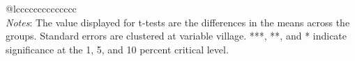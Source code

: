 \begin{tabular}{@{\extracolsep{5pt}}lcccccccccccccc}
\hline \hline \\[-1.8ex]
{\textit{Notes}:  The value displayed for t-tests are the differences in the means across the groups. Standard errors are clustered at variable village. ***, **, and * indicate significance at the 1, 5, and 10 percent critical level. }
\end{tabular}
